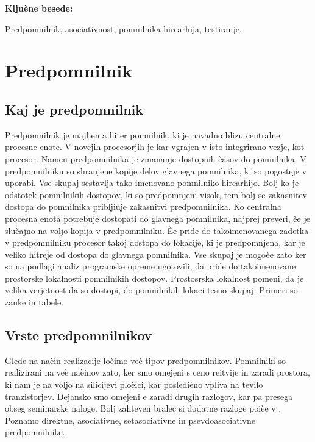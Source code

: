 \documentclass[12pt,a4paper,openany]{book}
\begin{document}
\vspace{1.3cm}
\noindent
{\large \bf Kljuène besede:}

\vspace{0.5cm}
\noindent
Predpomnilnik, asociativnost, pomnilnika hirearhija, testiranje.




\chapter{Predpomnilnik}

\section{Kaj je predpomnilnik}
Predpomnilnik je majhen a hiter pomnilnik, ki je navadno blizu centralne procesne enote. V novejih procesorjih je kar vgrajen v isto integrirano vezje, kot procesor. 
Namen predpomnilnika je zmananje dostopnih èasov do pomnilnika. V predpomnilniku so shranjene kopije delov glavnega pomnilnika, ki so pogosteje v uporabi. Vse skupaj 
sestavlja tako imenovano pomnilniko hirearhijo. Bolj ko je odstotek pomnilnikih dostopov, ki so predpomnjeni visok, tem bolj se zakasnitev dostopa do pomnilnika  pribljiuje
zakasnitvi predpomnilnika. Ko centralna procesna enota potrebuje dostopati do glavnega pomnilnika, najprej preveri, èe je sluèajno na voljo kopija v predpomnilniku. Èe pride do
takoimenovanega zadetka v predpomnilniku procesor takoj dostopa do lokacije, ki je predpomnjena, kar je veliko hitreje od dostopa do glavnega pomnilnika. Vse skupaj je mogoèe 
zato ker so na podlagi analiz programske opreme ugotovili, da pride do takoimenovane prostorske lokalnosti pomnilnikih dostopov. Prostosrska lokalnost pomeni, da je velika verjetnost
da so dostopi, do pomnilnikih lokaci tesno skupaj. Primeri so zanke in tabele.

\section{Vrste predpomnilnikov} 
Glede na naèin realizacije loèimo veè tipov predpomnilnikov. Pomnilniki so realizirani na veè naèinov zato, ker smo omejeni s ceno reitvije in zaradi prostora, ki nam je na voljo
na silicijevi ploèici, kar posledièno vpliva na tevilo tranzistorjev. Dejansko smo omejeni e zaradi drugih razlogov, kar pa presega obseg seminarske naloge. Bolj zahteven bralec
si dodatne razloge poièe v \cite{Kodek2000}. Poznamo direktne, asociativne, setasociativne in psevdoasociativne predpomnilnike. 
\end{document}
